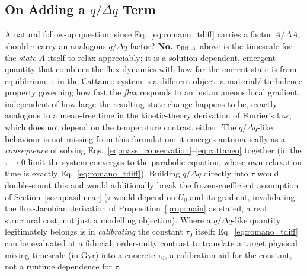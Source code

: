 \documentclass[11pt, a4paper, parskip]{scrartcl}
\theoremstyle{plain}
\theoremstyle{definition}
\theoremstyle{remark}
\newcommand{\driver}{q}                                  %
\newcommand{\taurelax}{\tau}                              %
\begin{document}
\subsection{On Adding a $\driver/\Delta\driver$ Term}
\label{sec:no-q-over-dq}
A natural follow-up question: since Eq.~\eqref{eq:romano_tdiff} carries a
factor $A/\Delta A$, should $\taurelax$ carry an analogous
$\driver/\Delta\driver$ factor? \textbf{No.} $\taurelax_{{\rm diff},A}$
above is the timescale for the \emph{state} $A$ itself to relax
appreciably; it is a solution-dependent, emergent quantity that combines
the flux dynamics with how far the current state is from equilibrium.
$\taurelax$ in the Cattaneo system is a different object: a material/
turbulence property governing how fast the \emph{flux} responds to an
instantaneous local gradient, independent of how large the resulting
state change happens to be, exactly analogous to a mean-free time in the
kinetic-theory derivation of Fourier's law, which does not depend on the
temperature contrast either. The $\driver/\Delta\driver$-like behaviour is
not missing from this formulation: it emerges automatically as a
\emph{consequence} of solving Eqs.~\eqref{eq:mass_conservation}--\eqref{eq:cattaneo}
together (in the $\taurelax\to0$ limit the system converges to the
parabolic equation, whose own relaxation time is exactly
Eq.~\eqref{eq:romano_tdiff}). Building $\driver/\Delta\driver$ directly
into $\taurelax$ would double-count this and would additionally break the
frozen-coefficient assumption of Section~\ref{sec:quasilinear} ($\taurelax$
would depend on $U_0$ and its gradient, invalidating the flux-Jacobian
derivation of Proposition~\ref{prop:main} as stated, a real structural
cost, not just a modelling objection). Where a $\driver/\Delta\driver$-like
quantity legitimately belongs is in \emph{calibrating} the constant
$\taurelax_0$ itself: Eq.~\eqref{eq:romano_tdiff} can be evaluated at a
fiducial, order-unity contrast to translate a target physical mixing
timescale (in Gyr) into a concrete $\taurelax_0$, a calibration aid for
the constant, not a runtime dependence for $\taurelax$.
\end{document}
